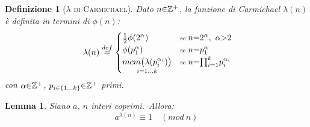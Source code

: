 \documentclass[twoside,symmetric,justified,openany,nobib]{tufte-book}
\newtheorem{lem}{Lemma}
\newtheorem{definizione}{Definizione}
\begin{document}
{\begin{definizione}[\textsc{$\lambda$ di Carmichael}]
    Dato $n{\in}\mathbb{Z}\textsuperscript{+}$, la \textit{funzione di Carmichael} $\lambda(n)$ è definita in termini di $\phi(n)$:
    \[
        \hspace{3pt}\lambda(n)\overset{def}{=}
        \begin{cases}
          \frac{1}{2}\phi(2^\alpha) &\text{\scriptsize se } n{=}2^\alpha,\ \alpha{>}2\\
          \phi(p^{\alpha}_{1}) &\text{\scriptsize se } n{=}p^{\alpha}_{1}\\
          \underset{i=1{\dots}k}{mcm\bigl(\lambda(p^{\alpha_i}_i)\bigr)} &\text{\scriptsize se } n{=}{\prod^{k}_{i=1}}p^{\alpha_i}_{i}
        \end{cases}
    \]
    con $\alpha{\in}\mathbb{Z}\textsuperscript{+}$, $p_{i\in{\{1{\dots}k\}}}{\in}\mathbb{Z}\textsuperscript{+}$ primi.
  \end{definizione}

  \begin{lem}
    Siano $a$, $n$ interi coprimi.\
    Allora:
    \begin{equation}
      a^{\lambda(n)}\equiv 1\quad (mod\ n)
    \end{equation}
  \end{lem}

}
\end{document}

